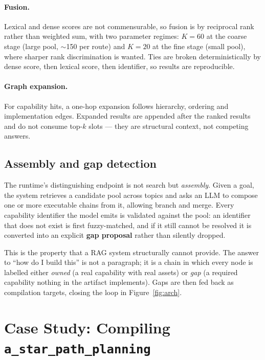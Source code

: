 \documentclass[10pt,a4paper]{article}
\begin{document}
\paragraph{Fusion.} Lexical and dense scores are not commensurable, so fusion is
by reciprocal rank~\cite{cormack2009rrf} rather than weighted sum, with two
parameter regimes: $K{=}60$ at the coarse stage (large pool, $\sim$150 per route)
and $K{=}20$ at the fine stage (small pool), where sharper rank discrimination is
wanted. Ties are broken deterministically by dense score, then lexical score,
then identifier, so results are reproducible.

\paragraph{Graph expansion.} For capability hits, a one-hop expansion follows
hierarchy, ordering and implementation edges. Expanded results are appended after
the ranked results and do not consume top-$k$ slots --- they are structural
context, not competing answers.

\subsection{Assembly and gap detection}

The runtime's distinguishing endpoint is not search but \emph{assembly}. Given a
goal, the system retrieves a candidate pool across topics and asks an LLM to
compose one or more executable chains from it, allowing branch and merge. Every
capability identifier the model emits is validated against the pool: an
identifier that does not exist is first fuzzy-matched, and if it still cannot be
resolved it is converted into an explicit \textbf{gap proposal} rather than
silently dropped.

This is the property that a RAG system structurally cannot provide. The answer to
``how do I build this'' is not a paragraph; it is a chain in which every node is
labelled either \emph{owned} (a real capability with real assets) or \emph{gap}
(a required capability nothing in the artifact implements). Gaps are then fed back
as compilation targets, closing the loop in Figure~\ref{fig:arch}.

\section{Case Study: Compiling \texttt{a\_star\_path\_planning}}
\label{sec:case}
\end{document}
